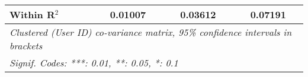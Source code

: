 \begin{table}[htbp]
\begin{threeparttable}[b]
\begin{tabular}{lccc}
         Within R$^2$                      & 0.01007           & 0.03612          & 0.07191\\  
         \midrule \midrule
         \multicolumn{4}{l}{\emph{Clustered (User ID) co-variance matrix, 95\% confidence intervals in brackets}}\\
         \multicolumn{4}{l}{\emph{Signif. Codes: ***: 0.01, **: 0.05, *: 0.1}}\\
      \end{tabular}
   \end{threeparttable}
\end{table}


